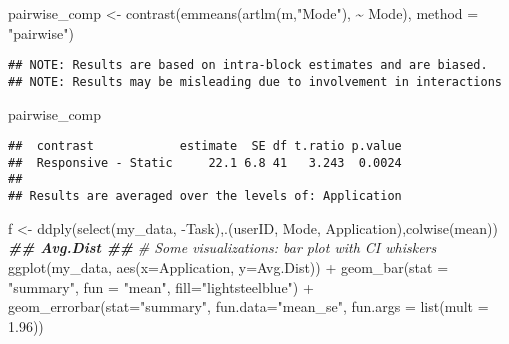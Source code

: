 \documentclass[
]{article}
\newenvironment{Shaded}{\begin{snugshade}}{\end{snugshade}}
\newcommand{\AttributeTok}[1]{\textcolor[rgb]{0.77,0.63,0.00}{#1}}
\newcommand{\CommentTok}[1]{\textcolor[rgb]{0.56,0.35,0.01}{\textit{#1}}}
\newcommand{\DocumentationTok}[1]{\textcolor[rgb]{0.56,0.35,0.01}{\textbf{\textit{#1}}}}
\newcommand{\FloatTok}[1]{\textcolor[rgb]{0.00,0.00,0.81}{#1}}
\newcommand{\FunctionTok}[1]{\textcolor[rgb]{0.00,0.00,0.00}{#1}}
\newcommand{\NormalTok}[1]{#1}
\newcommand{\OtherTok}[1]{\textcolor[rgb]{0.56,0.35,0.01}{#1}}
\newcommand{\SpecialCharTok}[1]{\textcolor[rgb]{0.00,0.00,0.00}{#1}}
\newcommand{\StringTok}[1]{\textcolor[rgb]{0.31,0.60,0.02}{#1}}
\begin{document}
\begin{Shaded}
\begin{Highlighting}[]
\NormalTok{pairwise\_comp }\OtherTok{\textless{}{-}} \FunctionTok{contrast}\NormalTok{(}\FunctionTok{emmeans}\NormalTok{(}\FunctionTok{artlm}\NormalTok{(m,}\StringTok{"Mode"}\NormalTok{), }\SpecialCharTok{\textasciitilde{}}\NormalTok{ Mode), }\AttributeTok{method =} \StringTok{"pairwise"}\NormalTok{)}
\end{Highlighting}
\end{Shaded}

\begin{verbatim}
## NOTE: Results are based on intra-block estimates and are biased.
## NOTE: Results may be misleading due to involvement in interactions
\end{verbatim}

\begin{Shaded}
\begin{Highlighting}[]
\NormalTok{pairwise\_comp}
\end{Highlighting}
\end{Shaded}

\begin{verbatim}
##  contrast            estimate  SE df t.ratio p.value
##  Responsive - Static     22.1 6.8 41   3.243  0.0024
## 
## Results are averaged over the levels of: Application
\end{verbatim}

\begin{Shaded}
\begin{Highlighting}[]
\NormalTok{f }\OtherTok{\textless{}{-}} \FunctionTok{ddply}\NormalTok{(}\FunctionTok{select}\NormalTok{(my\_data, }\SpecialCharTok{{-}}\NormalTok{Task),.(userID, Mode, Application),}\FunctionTok{colwise}\NormalTok{(mean))}
\DocumentationTok{\#\# Avg.Dist \#\#}
\CommentTok{\# Some visualizations: bar plot with CI whiskers }
\FunctionTok{ggplot}\NormalTok{(my\_data, }\FunctionTok{aes}\NormalTok{(}\AttributeTok{x=}\NormalTok{Application, }\AttributeTok{y=}\NormalTok{Avg.Dist)) }\SpecialCharTok{+} \FunctionTok{geom\_bar}\NormalTok{(}\AttributeTok{stat =} \StringTok{"summary"}\NormalTok{, }\AttributeTok{fun =} \StringTok{"mean"}\NormalTok{, }\AttributeTok{fill=}\StringTok{"lightsteelblue"}\NormalTok{) }\SpecialCharTok{+} \FunctionTok{geom\_errorbar}\NormalTok{(}\AttributeTok{stat=}\StringTok{"summary"}\NormalTok{, }\AttributeTok{fun.data=}\StringTok{"mean\_se"}\NormalTok{, }\AttributeTok{fun.args =} \FunctionTok{list}\NormalTok{(}\AttributeTok{mult =} \FloatTok{1.96}\NormalTok{))}
\end{Highlighting}
\end{Shaded}
\end{document}
